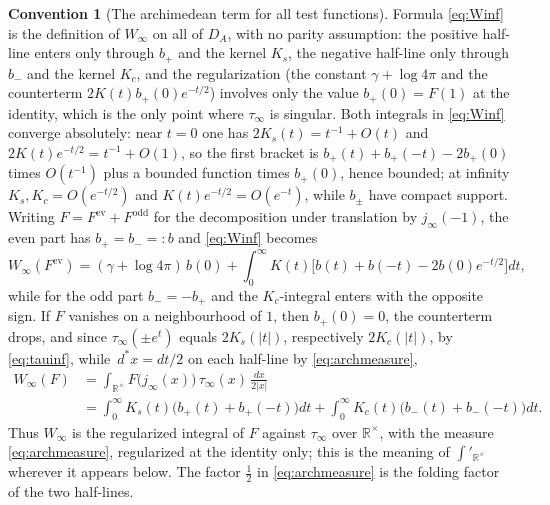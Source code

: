 \documentclass[11pt]{amsart}
\theoremstyle{definition}
\newtheorem{convention}[theorem]{Convention}
\theoremstyle{remark}
\newcommand{\R}{\mathbb R}
\newcommand{\dstar}{\,d^{*}}
\newcommand{\DA}{D_A}
\begin{document}
\begin{convention}[The archimedean term for all test functions]\label{conv:Winf}
Formula \eqref{eq:Winf} is the definition of $W_{\infty}$ on all of $\DA$,
with no parity assumption: the positive half-line enters only through $b_{+}$
and the kernel $K_{s}$, the negative half-line only through $b_{-}$ and the
kernel $K_{c}$, and the regularization (the constant $\gamma+\log4\pi$ and the
counterterm $2K(t)b_{+}(0)e^{-t/2}$) involves only the value $b_{+}(0)=F(1)$ at
the identity, which is the only point where $\tau_{\infty}$ is singular.  Both
integrals in \eqref{eq:Winf} converge absolutely: near $t=0$ one has
$2K_{s}(t)=t^{-1}+O(t)$ and $2K(t)e^{-t/2}=t^{-1}+O(1)$, so the first bracket is
$b_{+}(t)+b_{+}(-t)-2b_{+}(0)$ times $O(t^{-1})$ plus a bounded function times
$b_{+}(0)$, hence bounded; at infinity $K_{s},K_{c}=O(e^{-t/2})$ and
$K(t)e^{-t/2}=O(e^{-t})$, while $b_{\pm}$ have compact support.  Writing
$F=F^{\mathrm{ev}}+F^{\mathrm{odd}}$ for the decomposition under translation by
$j_{\infty}(-1)$, the even part has $b_{+}=b_{-}=:b$ and \eqref{eq:Winf}
becomes
\begin{equation}\label{eq:Winfeven}
W_{\infty}(F^{\mathrm{ev}})=(\gamma+\log4\pi)\,b(0)
+\int_0^{\infty}K(t)\bigl[b(t)+b(-t)-2b(0)e^{-t/2}\bigr]dt,
\end{equation}
while for the odd part $b_{-}=-b_{+}$ and the $K_{c}$-integral enters with the
opposite sign.  If $F$ vanishes on a neighbourhood of $1$, then $b_{+}(0)=0$,
the counterterm drops, and since $\tau_{\infty}(\pm e^{t})$ equals
$2K_{s}(|t|)$, respectively $2K_{c}(|t|)$, by \eqref{eq:tauinf}, while
$\dstar x=dt/2$ on each half-line by \eqref{eq:archmeasure},
\begin{equation}\label{eq:Winfint}
\begin{aligned}
W_{\infty}(F)&=\int_{\R^{\times}}F\bigl(j_{\infty}(x)\bigr)\,\tau_{\infty}(x)\,
\frac{dx}{2|x|}\\
&=\int_0^{\infty}K_{s}(t)\bigl(b_{+}(t)+b_{+}(-t)\bigr)dt
+\int_0^{\infty}K_{c}(t)\bigl(b_{-}(t)+b_{-}(-t)\bigr)dt .
\end{aligned}
\end{equation}
Thus $W_{\infty}$ is the regularized integral of $F$ against $\tau_{\infty}$
over $\R^{\times}$, with the measure \eqref{eq:archmeasure}, regularized at the
identity only; this is the meaning of $\int'_{\R^{\times}}$ wherever it
appears below.  The factor $\tfrac12$ in \eqref{eq:archmeasure} is the folding
factor of the two half-lines.
\end{convention}
\end{document}
